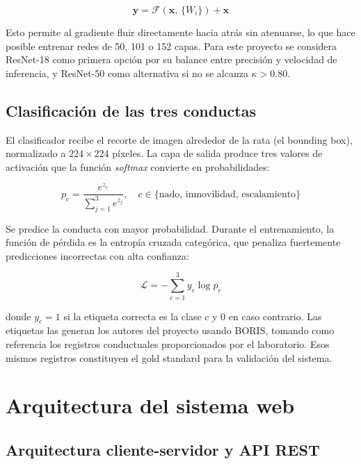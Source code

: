 \begin{equation}
    \mathbf{y} = \mathcal{F}(\mathbf{x},\, \{W_i\}) + \mathbf{x}
    \label{eq:resnet}
\end{equation}

Esto permite al gradiente fluir directamente hacia atrás sin atenuarse, lo que hace
posible entrenar redes de 50, 101 o 152 capas. Para este proyecto se considera ResNet-18
como primera opción por su balance entre precisión y velocidad de inferencia, y
ResNet-50 como alternativa si no se alcanza $\kappa > 0.80$.

\subsection{Clasificación de las tres conductas}

El clasificador recibe el recorte de imagen alrededor de la rata (el bounding box),
normalizado a $224 \times 224$ píxeles. La capa de salida produce tres valores de
activación que la función \textit{softmax} convierte en probabilidades:

\begin{equation}
    p_c = \frac{e^{z_c}}{\sum_{j=1}^{3} e^{z_j}}, \quad c \in \{\text{nado, inmovilidad, escalamiento}\}
    \label{eq:softmax}
\end{equation}

Se predice la conducta con mayor probabilidad. Durante el entrenamiento, la función de
pérdida es la entropía cruzada categórica, que penaliza fuertemente predicciones
incorrectas con alta confianza:

\begin{equation}
    \mathcal{L} = -\sum_{c=1}^{3} y_c \log p_c
    \label{eq:crossentropy}
\end{equation}

donde $y_c = 1$ si la etiqueta correcta es la clase $c$ y 0 en caso contrario. Las
etiquetas las generan los autores del proyecto usando BORIS, tomando como referencia los
registros conductuales proporcionados por el laboratorio. Esos mismos registros
constituyen el gold standard para la validación del sistema.

\section{Arquitectura del sistema web}

\subsection{Arquitectura cliente-servidor y API REST}


